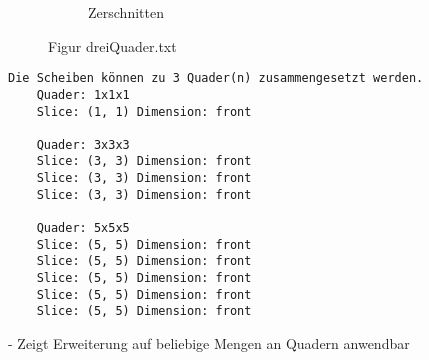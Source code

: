 \documentclass[a4paper,10pt,ngerman]{scrartcl}
\newcommand{\simplecube}[8]%
{
    \begin{scope}[shift={#1}]
        \fill[gray!40,canvas is yz plane at x=#2, opacity=#8] (0,0) rectangle (#3,#4);
        \fill[gray!10,canvas is xz plane at y=#3, opacity=#8] (0,0) rectangle (#2,#4);
        \fill[white  ,canvas is xy plane at z=#4, opacity=#8] (0,0) rectangle (#2,#3);
        \foreach\i/\j in {0/1, 1/1, 1/0}
            {
            \draw[line#5] (0,#3*\i,#4*\j) --++ (#2,0,0);
            \draw[line#6] (#2*\i,0,#4*\j) --++ (0,#3,0);
            \draw[line#7] (#2*\i,#3*\j,0) --++ (0,0,#4);
        }
    \end{scope}
}
\begin{document}
\begin{figure}[H]
\begin{subfigure}[b]{0.45\textwidth}
\begin{tikzpicture}[3d view={115}{30},line cap=round,line join=round,scale=0.4]
            \end{tikzpicture}
            \caption{Zerschnitten}\label{fig:figB4}
        \end{subfigure}
        \caption{Figur dreiQuader.txt}\label{fig:figAB4}
    \end{figure}

    \begin{lstlisting}[frame=single, title=Programmausgabe dreiQuader.txt, breaklines=true,label={lst:lstlisting5}]
    Die Scheiben können zu 3 Quader(n) zusammengesetzt werden.
    Quader: 1x1x1
    Slice: (1, 1) Dimension: front

    Quader: 3x3x3
    Slice: (3, 3) Dimension: front
    Slice: (3, 3) Dimension: front
    Slice: (3, 3) Dimension: front

    Quader: 5x5x5
    Slice: (5, 5) Dimension: front
    Slice: (5, 5) Dimension: front
    Slice: (5, 5) Dimension: front
    Slice: (5, 5) Dimension: front
    Slice: (5, 5) Dimension: front
    \end{lstlisting}

    - Zeigt Erweiterung auf beliebige Mengen an Quadern anwendbar

    \newpage
\end{document}
